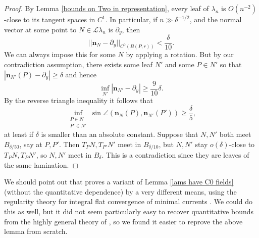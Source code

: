 \documentclass[reqno,11pt]{amsart}
\newcommand{\Leaves}{\mathscr L}
\newcommand{\normal}{\mathbf n}
\theoremstyle{definition}
\numberwithin{equation}{section}
\begin{document}
\begin{proof}
	By Lemma \ref{bounds on Two in representation}, every leaf of $\lambda_n$ is $O(n^{-2})$-close to its tangent spaces in $C^1$.
	In particular, if $n \gg \delta^{-1/2}$, and the normal vector at some point to $N \in \Leaves \lambda_n$ is $\partial_y$, then
	$$||\normal_N - \partial_y||_{C^0(B(P, r))} < \frac{\delta}{10}.$$
	We can always impose this for some $N$ by applying a rotation.
	But by our contradiction assumption, there exists some leaf $N'$ and some $P \in N'$ so that $|\normal_{N'}(P) - \partial_y| \geq \delta$ and hence
	$$\inf_{N'} |\normal_{N'} - \partial_y| \geq \frac{9}{10}\delta.$$
	By the reverse triangle inequality it follows that
	$$\inf_{\substack{P \in N\\ P' \in N'}} \sin \angle(\normal_N(P), \normal_{N'}(P')) \geq \frac{\delta}{5},$$
	at least if $\delta$ is smaller than an absolute constant.
	Suppose that $N, N'$ both meet $B_{\delta/50}$, say at $P, P'$. Then $T_PN, T_{P'} N'$ meet in $B_{\delta/10}$, but $N, N'$ stay $o(\delta)$-close to $T_PN, T_PN'$, so $N, N'$ meet in $B_\delta$. This is a contradiction since they are leaves of the same lamination.
\end{proof}

We should point out that \cite{Solomon86} proves a variant of Lemma \ref{lams have C0 fields} (without the quantitative dependence) by a very different means, using the regularity theory for integral flat convergence of minimal currents \cite[Theorem 5.3.14]{federer2014geometric}.
We could do this as well, but it did not seem particularly easy to recover quantitative bounds from the highly general theory of \cite[Chapter 5]{federer2014geometric}, so we found it easier to reprove the above lemma from scratch.
\end{document}

